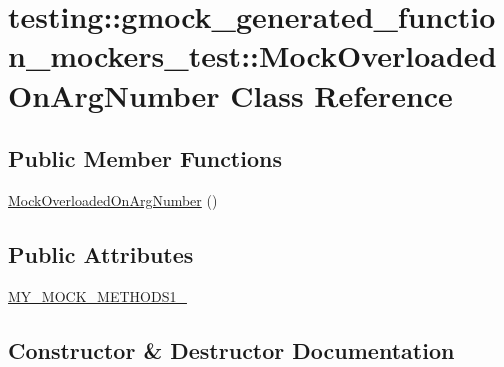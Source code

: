 \hypertarget{classtesting_1_1gmock__generated__function__mockers__test_1_1MockOverloadedOnArgNumber}{}\section{testing\+::gmock\+\_\+generated\+\_\+function\+\_\+mockers\+\_\+test\+::Mock\+Overloaded\+On\+Arg\+Number Class Reference}
\label{classtesting_1_1gmock__generated__function__mockers__test_1_1MockOverloadedOnArgNumber}
\subsection*{Public Member Functions}
\begin{DoxyCompactItemize}
\item 
\mbox{\hyperlink{classtesting_1_1gmock__generated__function__mockers__test_1_1MockOverloadedOnArgNumber_ad5b40981c39bc0bec3b63632cf827153}{Mock\+Overloaded\+On\+Arg\+Number}} ()
\end{DoxyCompactItemize}
\subsection*{Public Attributes}
\begin{DoxyCompactItemize}
\item 
\mbox{\hyperlink{classtesting_1_1gmock__generated__function__mockers__test_1_1MockOverloadedOnArgNumber_a5076ebd17fb1cc93952b4a80fe6de894}{M\+Y\+\_\+\+M\+O\+C\+K\+\_\+\+M\+E\+T\+H\+O\+D\+S1\+\_\+}}
\end{DoxyCompactItemize}


\subsection{Constructor \& Destructor Documentation}
\mbox{\label{classtesting_1_1gmock__generated__function__mockers__test_1_1MockOverloadedOnArgNumber_ad5b40981c39bc0bec3b63632cf827153}} 
